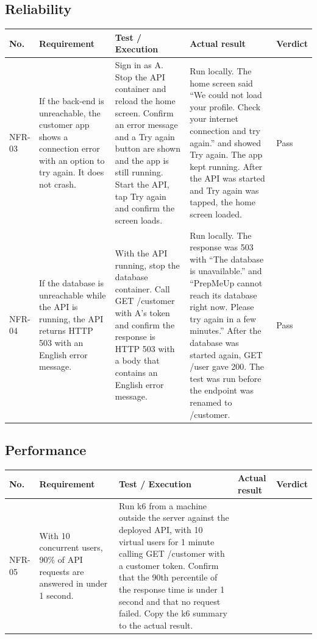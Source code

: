 \documentclass[a4paper,11pt]{article}
\begin{document}
\subsection{Reliability}
\begin{center}
\footnotesize
\begin{tabular}{@{}p{1.2cm}p{3.8cm}p{5.8cm}p{1.7cm}p{1.3cm}@{}}
\hline
\textbf{No.} & \textbf{Requirement} & \textbf{Test / Execution} & \textbf{Actual result} & \textbf{Verdict} \\
\hline
NFR-03 & If the back-end is unreachable, the customer app shows a connection error with an option to try again. It does not crash. & Sign in as A. Stop the API container and reload the home screen. Confirm an error message and a Try again button are shown and the app is still running. Start the API, tap Try again and confirm the screen loads. & Run locally. The home screen said ``We could not load your profile. Check your internet connection and try again.'' and showed Try again. The app kept running. After the API was started and Try again was tapped, the home screen loaded. & Pass \\
\hline
NFR-04 & If the database is unreachable while the API is running, the API returns HTTP 503 with an English error message. & With the API running, stop the database container. Call GET /customer with A's token and confirm the response is HTTP 503 with a body that contains an English error message. & Run locally. The response was 503 with ``The database is unavailable.'' and ``PrepMeUp cannot reach its database right now. Please try again in a few minutes.'' After the database was started again, GET /user gave 200. The test was run before the endpoint was renamed to /customer. & Pass \\
\hline
\end{tabular}
\end{center}

\subsection{Performance}
\begin{center}
\footnotesize
\begin{tabular}{@{}p{1.2cm}p{3.8cm}p{5.8cm}p{1.7cm}p{1.3cm}@{}}
\hline
\textbf{No.} & \textbf{Requirement} & \textbf{Test / Execution} & \textbf{Actual result} & \textbf{Verdict} \\
\hline
NFR-05 & With 10 concurrent users, 90\% of API requests are answered in under 1 second. & Run k6 from a machine outside the server against the deployed API, with 10 virtual users for 1 minute calling GET /customer with a customer token. Confirm that the 90th percentile of the response time is under 1 second and that no request failed. Copy the k6 summary to the actual result. & & \\
\hline
\end{tabular}
\end{center}
\end{document}
